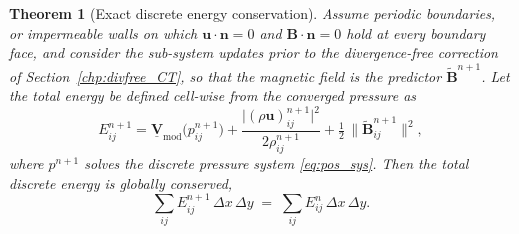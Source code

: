 \documentclass[a4paper,fleqn]{cas-sc}
\newtheorem{theorem}{Theorem}
\theoremstyle{definition}
\theoremstyle{remark}
\begin{document}
\begin{theorem}[Exact discrete energy conservation]
\label{thm:conservation}
Assume periodic boundaries, or impermeable walls on which
$\mathbf{u}\cdot\mathbf{n}=0$ and $\mathbf{B}\cdot\mathbf{n}=0$ hold at every
boundary face, and consider the sub-system updates prior to the
divergence-free correction of Section~\ref{chp:divfree_CT}, so that the magnetic
field is the predictor $\tilde{\mathbf{B}}^{n+1}$. Let the total energy be defined
cell-wise from the converged pressure as
\begin{equation}
\label{eq:Udef_VP}
E^{n+1}_{ij}
 = \underline{\mathbf{V}}_{\mathrm{mod}}\bigl(p^{n+1}_{ij}\bigr)
 + \frac{\bigl|(\rho\mathbf{u})^{n+1}_{ij}\bigr|^{2}}{2\rho^{n+1}_{ij}}
 + \tfrac12\,\bigl\|\tilde{\mathbf{B}}^{n+1}_{ij}\bigr\|^{2},
\end{equation}
where $p^{n+1}$ solves the discrete pressure system \eqref{eq:pos_sys}. Then the total
discrete energy is globally conserved,
\begin{equation}
\label{eq:energy_conservation}
\sum_{ij} E^{n+1}_{ij}\,\Delta x\,\Delta y \;=\; \sum_{ij} E^{n}_{ij}\,\Delta x\,\Delta y.
\end{equation}
\end{theorem}
\end{document}
